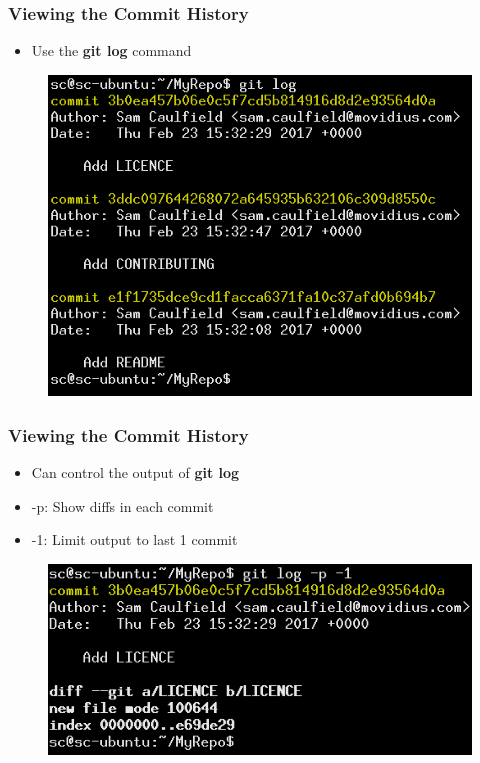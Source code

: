 \documentclass{beamer}
\begin{document}
\begin{frame}
	\frametitle{Viewing the Commit History}
	\begin{itemize}
		\item{Use the \textbf{git log} command}
	\end{itemize}
	\begin{figure}
		\includegraphics[scale=0.4]{Viewing_the_Commit_History-0.png}
	\end{figure}
\end{frame}

\begin{frame}
	\frametitle{Viewing the Commit History}
	\begin{itemize}
		\item{Can control the output of \textbf{git log}}
		\item{-p: Show diffs in each commit}
		\item{-1: Limit output to last 1 commit}
	\end{itemize}
	\begin{figure}
		\includegraphics[scale=0.6]{Viewing_the_Commit_History-1.png}
	\end{figure}
\end{frame}
\end{document}
